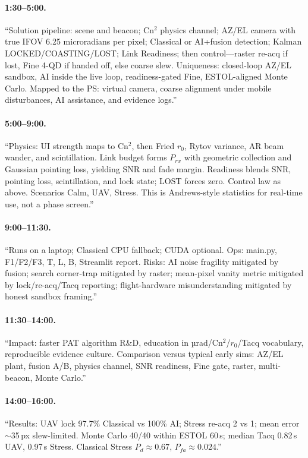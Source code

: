 \documentclass[11pt,a4paper]{article}
\begin{document}
\paragraph{1:30--5:00.}
``Solution pipeline: scene and beacon; Cn$^2$ physics channel; AZ/EL camera with true IFOV 6.25 microradians per pixel; Classical or AI+fusion detection; Kalman LOCKED/COASTING/LOST; Link Readiness; then control---raster re-acq if lost, Fine 4-QD if handed off, else coarse slew.
Uniqueness: closed-loop AZ/EL sandbox, AI inside the live loop, readiness-gated Fine, ESTOL-aligned Monte Carlo.
Mapped to the PS: virtual camera, coarse alignment under mobile disturbances, AI assistance, and evidence logs.''

\paragraph{5:00--9:00.}
``Physics: UI strength maps to Cn$^2$, then Fried $r_0$, Rytov variance, AR beam wander, and scintillation.
Link budget forms $P_{rx}$ with geometric collection and Gaussian pointing loss, yielding SNR and fade margin.
Readiness blends SNR, pointing loss, scintillation, and lock state; LOST forces zero.
Control law as above.
Scenarios Calm, UAV, Stress.
This is Andrews-style statistics for real-time use, not a phase screen.''

\paragraph{9:00--11:30.}
``Runs on a laptop; Classical CPU fallback; CUDA optional.
Ops: main.py, F1/F2/F3, T, L, B, Streamlit report.
Risks: AI noise fragility mitigated by fusion; search corner-trap mitigated by raster; mean-pixel vanity metric mitigated by lock/re-acq/Tacq reporting; flight-hardware misunderstanding mitigated by honest sandbox framing.''

\paragraph{11:30--14:00.}
``Impact: faster PAT algorithm R\&D, education in µrad/Cn$^2$/$r_0$/Tacq vocabulary, reproducible evidence culture.
Comparison versus typical early sims: AZ/EL plant, fusion A/B, physics channel, SNR readiness, Fine gate, raster, multi-beacon, Monte Carlo.''

\paragraph{14:00--16:00.}
``Results: UAV lock 97.7\% Classical vs 100\% AI; Stress re-acq 2 vs 1; mean error $\sim$35\,px slew-limited.
Monte Carlo 40/40 within ESTOL 60\,s; median Tacq 0.82\,s UAV, 0.97\,s Stress.
Classical Stress $P_d\approx0.67$, $P_{fa}\approx0.024$.''
\end{document}

